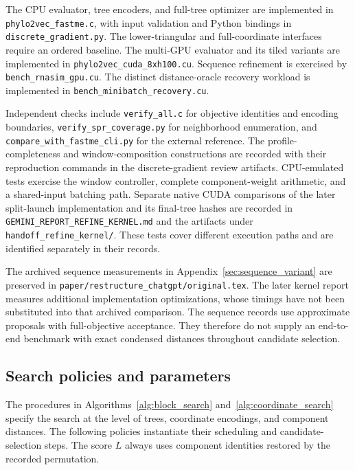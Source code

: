 The CPU evaluator, tree encoders, and full-tree optimizer are implemented in
\texttt{phylo2vec\_fastme.c}, with input validation and Python bindings in
\texttt{discrete\_gradient.py}.
The lower-triangular and full-coordinate interfaces require an ordered baseline.
The multi-GPU evaluator and its tiled variants are implemented in
\texttt{phylo2vec\_cuda\_8xh100.cu}.
Sequence refinement is exercised by \texttt{bench\_rnasim\_gpu.cu}.
The distinct distance-oracle recovery workload is implemented in
\texttt{bench\_minibatch\_recovery.cu}.

Independent checks include \texttt{verify\_all.c} for objective identities and encoding boundaries,
\texttt{verify\_spr\_coverage.py} for neighborhood enumeration, and
\texttt{compare\_with\_fastme\_cli.py} for the external reference.
The profile-completeness and window-composition constructions are recorded with their reproduction commands in the discrete-gradient review artifacts.
CPU-emulated tests exercise the window controller, complete component-weight arithmetic, and a shared-input batching path.
Separate native CUDA comparisons of the later split-launch implementation and its final-tree hashes are recorded in
\texttt{GEMINI\_REPORT\_REFINE\_KERNEL.md} and the artifacts under
\texttt{handoff\_refine\_kernel/}.
These tests cover different execution paths and are identified separately in their records.

The archived sequence measurements in Appendix~\ref{sec:sequence_variant} are preserved in
\nolinkurl{paper/restructure_chatgpt/original.tex}.
The later kernel report measures additional implementation optimizations, whose timings have not been substituted into that archived comparison.
The sequence records use approximate proposals with full-objective acceptance.
They therefore do not supply an end-to-end benchmark with exact condensed distances throughout candidate selection.

\subsection{Search policies and parameters}
\label{sec:search_policies}

The procedures in Algorithms~\ref{alg:block_search} and~\ref{alg:coordinate_search} specify the search at the level of trees, coordinate encodings, and component distances.
The following policies instantiate their scheduling and candidate-selection steps.
The score $L$ always uses component identities restored by the recorded permutation.

